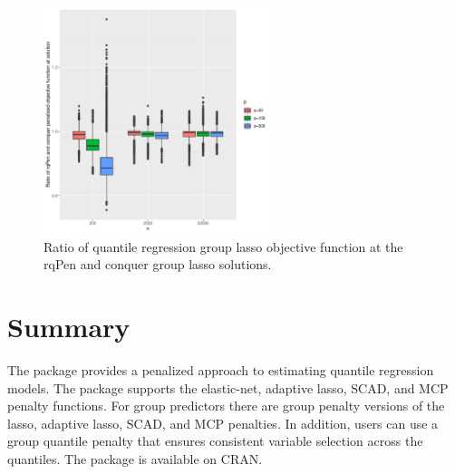 \begin{figure}

{\centering \includegraphics[width=250px,height=250px]{figures/lassoObjCompareGroup} 

}

\caption{Ratio of quantile regression group lasso objective function at the rqPen and conquer group lasso solutions.}\label{fig:lassoObjCompareGroup}
\end{figure}

\section{Summary}\label{summary}

The  package provides a penalized approach to estimating quantile regression models. The package supports the elastic-net, adaptive lasso, SCAD, and MCP penalty functions. For group predictors there are group penalty versions of the lasso, adaptive lasso, SCAD, and MCP penalties. In addition, users can use a group quantile penalty that ensures consistent variable selection across the quantiles. The package is available on CRAN.

